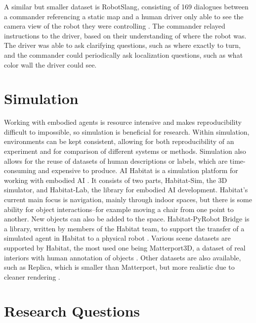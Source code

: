 A similar but smaller dataset is RobotSlang, consisting of 169 dialogues between a commander referencing a static map and a human driver only able to see the camera view of the robot they were controlling \cite{robotslang}. The commander relayed instructions to the driver, based on their understanding of where the robot was. The driver was able to ask clarifying questions, such as where exactly to turn, and the commander could periodically ask localization questions, such as what color wall the driver could see. \newline
\section{Simulation}
Working with embodied agents is resource intensive and makes reproducibility difficult to impossible, so simulation is beneficial for research. Within simulation, environments can be kept consistent, allowing for both reproducibility of an experiment and for comparison of different systems or methods. Simulation also allows for the reuse of datasets of human descriptions or labels, which are time-consuming and expensive to produce. \newline
{}
AI Habitat is a simulation platform for working with embodied AI \cite{habitat19iccv}. It consists of two parts, Habitat-Sim, the 3D simulator, and Habitat-Lab, the library for embodied AI development. Habitat's current main focus is navigation, mainly through indoor spaces, but there is some ability for object interactions--for example moving a chair from one point to another. New objects can also be added to the space. Habitat-PyRobot Bridge is a library, written by members of the Habitat team, to support the transfer of a simulated agent in Habitat to a physical robot \cite{Kadian_2020}. Various scene datasets are supported by Habitat, the most used one being Matterport3D, a dataset of real interiors with human annotation of objects \cite{matterport}. Other datasets are also available, such as Replica, which is smaller than Matterport, but more realistic due to cleaner rendering \cite{replica}. 



\section{Research Questions}


